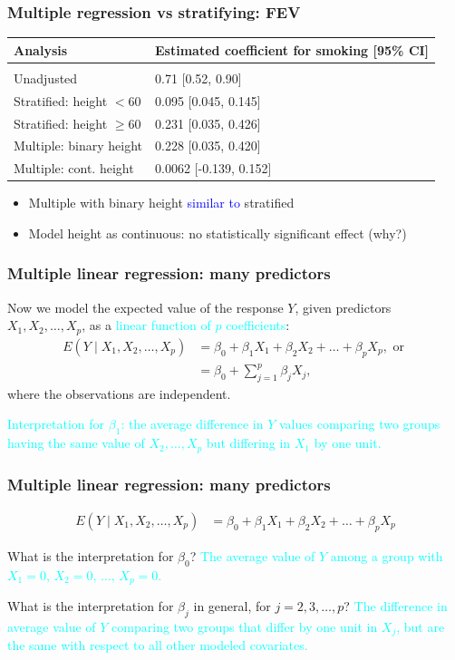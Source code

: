 \documentclass[12pt, 
hyperref={colorlinks=true, linkcolor=blue, urlcolor=cyan}]{beamer}
\begin{document}
\begin{frame}
\frametitle{Multiple regression vs stratifying: FEV}
\vspace{-1cm}\hspace*{-0.75cm}\begin{tabular}{ll}
Analysis & Estimated coefficient for smoking [95\% CI] \\
\hline \\
Unadjusted  & 0.71 [0.52, 0.90]\\
Stratified: height $< 60$ & 0.095 [0.045, 0.145]\\
Stratified: height $\geq 60$ & 0.231 [0.035, 0.426] \\
Multiple: binary height & 0.228 [0.035, 0.420] \\
Multiple: cont. height & 0.0062 [-0.139, 0.152]
\end{tabular}

\begin{itemize}
\item Multiple with binary height \textcolor{blue}{similar to} stratified
\item Model height as continuous: no statistically significant effect (why?)
\end{itemize} 
\end{frame}

\begin{frame}
\frametitle{Multiple linear regression: many predictors}
Now we model the expected value of the response $Y$, given predictors $X_1, X_2, \dots, X_p$, as a \textcolor{cyan}{linear function of $p$ coefficients}:
\begin{align*}
E(Y \mid X_1, X_2, \dots, X_p) &= \beta_0 + \beta_1 X_1 + \beta_2 X_2 + \dots + \beta_p X_p, \text{ or } \\
&= \beta_0 + \sum_{j=1}^p \beta_j X_j,
\end{align*} 
where the observations are independent.

\textcolor{cyan}{Interpretation for $\beta_1$: the average difference in $Y$ values comparing two groups having the same value of $X_2, \dots, X_p$ but differing in $X_1$ by one unit.}

\end{frame}

\begin{frame}
\frametitle{Multiple linear regression: many predictors}
\begin{align*}
E(Y \mid X_1, X_2, \dots, X_p) &= \beta_0 + \beta_1 X_1 + \beta_2 X_2 + \dots + \beta_p X_p
\end{align*}

What is the interpretation for $\beta_0$? \pause \textcolor{cyan}{The average value of $Y$ among a group with $X_1 = 0$, $X_2 = 0$, $\dots$, $X_p = 0$.} \pause

What is the interpretation for $\beta_j$ in general, for $j = 2, 3, \dots, p$? \pause \textcolor{cyan}{The difference in average value of $Y$ comparing two groups that differ by one unit in $X_j$, but are the same with respect to all other modeled covariates.}

\end{frame}
\end{document}
